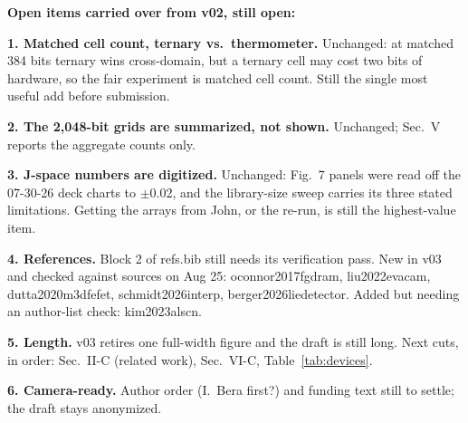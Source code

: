 \documentclass[conference]{IEEEtran}
\begin{document}
{\begin{pnote}[aiviolet]
\textbf{Open items carried over from v02, still open:}

\textbf{1. Matched cell count, ternary vs.\ thermometer.} Unchanged:
at matched 384 bits ternary wins cross-domain, but a ternary cell may
cost two bits of hardware, so the fair experiment is matched cell
count. Still the single most useful add before submission.

\textbf{2. The 2,048-bit grids are summarized, not shown.} Unchanged;
Sec.~V reports the aggregate counts only.

\textbf{3. J-space numbers are digitized.} Unchanged: Fig.~7 panels
were read off the 07-30-26 deck charts to $\pm$0.02, and the
library-size sweep carries its three stated limitations. Getting the
arrays from John, or the re-run, is still the highest-value item.

\textbf{4. References.} Block 2 of refs.bib still needs its
verification pass. New in v03 and checked against sources on Aug 25:
oconnor2017fgdram, liu2022evacam, dutta2020m3dfefet, schmidt2026interp,
berger2026liedetector. Added but needing an author-list check:
kim2023alscn.

\textbf{5. Length.} v03 retires one full-width figure and the draft is
still long. Next cuts, in order: Sec.~II-C (related work), Sec.~VI-C,
Table~\ref{tab:devices}.

\textbf{6. Camera-ready.} Author order (I.~Bera first?) and funding
text still to settle; the draft stays anonymized.
\end{pnote}
}
\end{document}
